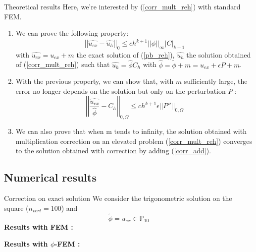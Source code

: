 \documentclass[compress,10pt,xcolor={table,dvipsnames},t]{beamer}
\begin{document}
	\begin{frame}{Theoretical results}
		Here, we're interested by (\ref{corr_mult_reh}) with standard FEM.
		\begin{enumerate}[\ding{217}]
			\item We can prove the following property:
			\begin{equation*}
				\left|\left|\hat{u_{ex}}-\hat{u_h}\right|\right|_0\le ch^{k+1}||\hat{\phi}||_\infty\left|C\right|_{k+1}
			\end{equation*}
			with $\hat{u_{ex}}=u_{ex}+m$ the exact solution of (\ref{pb_reh}), $\hat{u_h}$ the solution obtained of (\ref{corr_mult_reh}) such that $\hat{u_h}=\hat{\phi}C_h$ with $\hat{\phi}=\tilde{\phi}+m=u_{ex}+\epsilon P+m$.
			\item With the previous property, we can show that, with $m$ sufficiently large, the error no longer depends on the solution but only on the perturbation $P$ :
			\begin{equation*}
				\left|\left|\frac{\hat{u_{ex}}}{\hat{\phi}}-C_h\right|\right|_{0,\Omega}\le ch^{k+1}\epsilon\left|\left|P''\right|\right|_{0,\Omega}
			\end{equation*}
			\item We can also prove that when m tends to infinity, the solution obtained with multiplication correction on an elevated problem  (\ref{corr_mult_reh}) converges to the solution obtained with correction by adding (\ref{corr_add}).
		\end{enumerate}
	\end{frame}
	
	\subsection{Numerical results}
	
	\begin{frame}{Correction on exact solution}
		We consider the trigonometric solution on the square ($n_{vert}=100$) and
		$$\tilde{\phi}=u_{ex}\in\mathbb{P}_{10}$$
		\textbf{Results with FEM :}
		\begin{center}
		\end{center}
		\textbf{Results with $\phi$-FEM :}
		\begin{center}
		\end{center}
	\end{frame}
\end{document}
